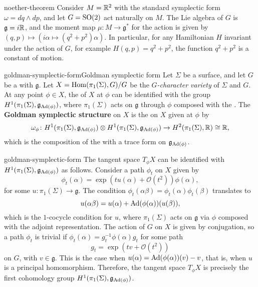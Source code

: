 \begin{example}{noether-theorem}
    Consider $M = \mathbb{R}^2$ with the standard symplectic form $\omega = dq \wedge dp$, and let $G = \textup{SO}(2)$ act naturally on $M$. The Lie algebra of $G$ is $\mathfrak{g} = i\mathbb{R}$, and the moment map $\mu \colon M \to \mathfrak{g}^*$ for the action is given by $(q, p) \mapsto (i \alpha \mapsto (q^2 + p^2) \alpha)$.
    In particular, for any Hamiltonian $H$ invariant under the action of $G$, for example $H(q, p) = q^2 + p^2$, the function $q^2 + p^2$ is a constant of motion.
\end{example}

\begin{topic}{goldman-symplectic-form}{Goldman symplectic form}
    Let $\Sigma$ be a  surface, and let $G$ be a  with  $\mathfrak{g}$.
    Let $X = \operatorname{Hom}(\pi_1(\Sigma), G) / G$ be the \textit{$G$-character variety} of $\Sigma$ and $G$. At any point $\phi \in X$, the  of $X$ at $\phi$ can be identified with the  group $H^1(\pi_1(\Sigma), \mathfrak{g}_{\textup{Ad}(\phi)})$, where $\pi_1(\Sigma)$ acts on $\mathfrak{g}$ through $\phi$ composed with the . The \textbf{Goldman symplectic structure} on $X$ is the  on $X$ given at $\phi$ by
    \[ \omega_\phi \colon H^1(\pi_1(\Sigma), \mathfrak{g}_{\textup{Ad}(\phi)}) \otimes H^1(\pi_1(\Sigma), \mathfrak{g}_{\textup{Ad}(\phi)}) \to H^2(\pi_1(\Sigma), \mathbb{R}) \cong \mathbb{R} , \]
    which is the composition of the  with a trace form on $\mathfrak{g}_{\textup{Ad}(\phi)}$.
\end{topic}

\begin{example}{goldman-symplectic-form}
    The tangent space $T_\phi X$ can be identified with $H^1(\pi_1(\Sigma), \mathfrak{g}_{\textup{Ad}(\phi)})$ as follows. Consider a path $\phi_t$ on $X$ given by
    \[ \phi_t(\alpha) = \exp(t u(\alpha) + \mathcal{O}(t^2)) \phi(\alpha) , \]
    for some $u \colon \pi_1(\Sigma) \to \mathfrak{g}$. The condition $\phi_t(\alpha \beta) = \phi_t(\alpha) \phi_t(\beta)$ translates to
    \[ u(\alpha \beta) = u(\alpha) + \textup{Ad}(\phi(\alpha))(u(\beta)) , \]
    which is the $1$-cocycle condition for $u$, where $\pi_1(\Sigma)$ acts on $\mathfrak{g}$ via $\phi$ composed with the adjoint representation. The action of $G$ on $X$ is given by conjugation, so a path $\phi_t$ is trivial if $\phi_t(\alpha) = g_t^{-1} \phi(\alpha) g_t$ for some path
    \[ g_t = \exp(t v + \mathcal{O}(t^2)) \]
    on $G$, with $v \in \mathfrak{g}$. This is the case when $u(\alpha) = \textup{Ad}(\phi(\alpha))(v) - v$, that is, when $u$ is a principal homomorphism. Therefore, the tangent space $T_\phi X$ is precisely the first cohomology group $H^1(\pi_1(\Sigma), \mathfrak{g}_{\textup{Ad}(\phi)})$.
\end{example}

